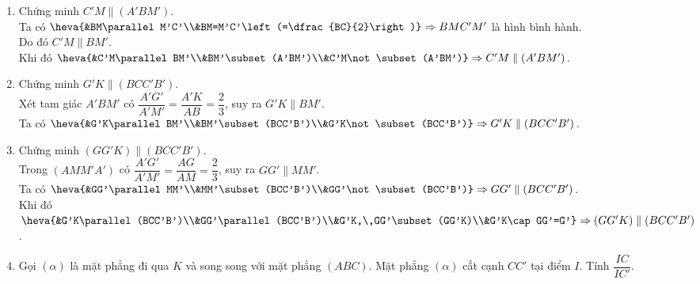 \begin{bt}
\begin{bt}
{\begin{center}
\begin{tikzpicture}[scale=1, font=\footnotesize, line join=round, line cap=round, >=stealth]
			\end{tikzpicture}
		\end{center}
		\begin{enumerate}
			\item Chứng minh $C'M\parallel (A'BM')$.\\
			Ta có $\heva{&BM\parallel M'C'\\&BM=M'C'\left(=\dfrac{BC}{2}\right)}\Rightarrow BMC'M'$ là hình bình hành.\\
			Do đó $C'M\parallel BM'$.\\
			Khi đó $\heva{&C'M\parallel BM'\\&BM'\subset (A'BM')\\&C'M\not\subset (A'BM')}\Rightarrow C'M\parallel (A'BM')$.
			\item Chứng minh $G'K\parallel (BCC'B')$.\\
			Xét tam giác $A'BM'$ có $\dfrac{A'G'}{A'M'}=\dfrac{A'K}{AB}=\dfrac{2}{3}$, suy ra $G'K\parallel BM'$.\\
			Ta có $\heva{&G'K\parallel BM'\\&BM'\subset (BCC'B')\\&G'K\not\subset (BCC'B')}\Rightarrow G'K\parallel (BCC'B')$.
			\item Chứng minh $(GG'K)\parallel (BCC'B')$.\\
			Trong $(AMM'A')$ có $\dfrac{A'G'}{A'M'}=\dfrac{AG}{AM}=\dfrac{2}{3}$, suy ra $GG'\parallel MM'$.\\
			Ta có $\heva{&GG'\parallel MM'\\&MM'\subset (BCC'B')\\&GG'\not\subset (BCC'B')}\Rightarrow GG'\parallel (BCC'B')$.\\
			Khi đó $\heva{&G'K\parallel (BCC'B')\\&GG'\parallel (BCC'B')\\&G'K,\,GG'\subset (GG'K)\\&G'K\cap GG'=G'}\Rightarrow (GG'K)\parallel (BCC'B')$.
			\item Gọi $(\alpha)$ là mặt phẳng đi qua $K$ và song song với mặt phẳng $(ABC)$. Mặt phẳng $(\alpha)$ cắt cạnh $CC'$ tại điểm $I$. Tính $\dfrac{IC}{IC'}$.		
\end{enumerate}}
\end{bt}
\end{bt}
